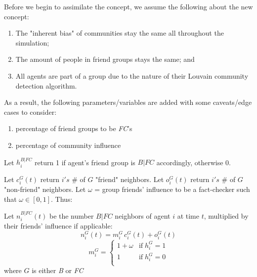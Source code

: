 \documentclass{article}
\begin{document}
Before we begin to assimilate the concept, we assume the following about the new concept:
\begin{enumerate}
  \item The "inherent bias" of communities stay the same all throughout the simulation;
  \item The amount of people in friend groups stays the same; and
  \item All agents are part of a group due to the nature of their
    Louvain community detection algorithm.
\end{enumerate}

\begin{sloppypar}
  As a result, the following parameters/variables are added
with some caveats/edge cases to consider:
\end{sloppypar}
\begin{enumerate}
  \item percentage of friend groups to be \textit{FC}'s
  \item percentage of community influence
\end{enumerate}

%

Let $h_i^{B|FC}$ return 1 if agent's friend group is $B|FC$ accordingly, otherwise 0. 

Let $c_i^G(t)$ return $i's$ \# of $G$ "friend" neighbors. Let $o_i^G(t)$ return $i's$ \# of $G$ "non-friend" neighbors. Let $\omega$ = group friends' influence to be a fact-checker such that $\omega \in [0,1]$. Thus:

Let $n_i^{B|FC}(t)$ be the number $B|FC$ neighbors of agent $i$ at time $t$,
multiplied by their friends' influence if applicable:
\begin{equation} n_i^G(t)=m_i^G\,c_i^G(t)+o_i^G(t) \end{equation}
\begin{equation}
  m_i^G= 
  \begin{cases}
    1 + \omega & \text{if}\; h_i^G = 1 \\
    1 & \text{if}\; h_i^G = 0 \\
  \end{cases} \end{equation}
where $G$ is either \textit{B} or \textit{FC}
\end{document}
